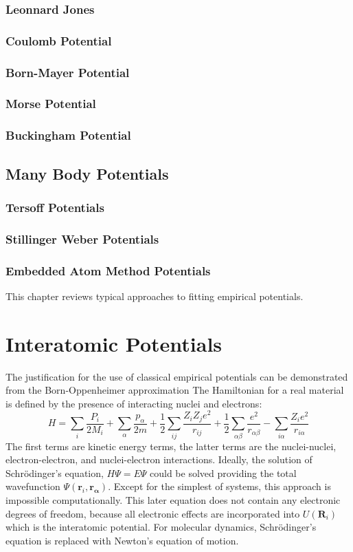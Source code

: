 \subsubsection{Leonnard Jones}
\subsubsection{Coulomb Potential}
\subsubsection{Born-Mayer Potential}
\subsubsection{Morse Potential}
\subsubsection{Buckingham Potential}
\subsection{Many Body Potentials}
\subsubsection{Tersoff Potentials}
\subsubsection{Stillinger Weber Potentials}
\subsubsection{Embedded Atom Method Potentials}
This chapter reviews typical approaches to fitting empirical potentials.
\section{Interatomic Potentials}
The justification for the use of classical empirical potentials can be demonstrated from the Born-Oppenheimer approximation\cite{born1927_bo}  The Hamiltonian for a real material is defined by the presence of interacting nuclei and electrons:
\begin{equation}
	H = \sum_i \frac{P_i}{2M_i}
	    + \sum_\alpha \frac{p_\alpha}{2m}
	    + \frac{1}{2} \sum_{ij} \frac{Z_i Z_j e^2}{r_{ij}}
	    + \frac{1}{2} \sum_{\alpha\beta} \frac{e^2}{r_{\alpha\beta}}
	    - \sum_{i\alpha} \frac{Z_i e^2}{r_{i\alpha}}
\end{equation}
The first terms are kinetic energy terms, the latter terms are the nuclei-nuclei, electron-electron, and nuclei-electron interactions.  Ideally, the solution of Schr\"{o}dinger's equation, $H\Psi=E\Psi$ could be solved providing the total wavefunction $\Psi(\bm{r}_i,\bm{r_\alpha})$.  Except for the simplest of systems, this approach is impossible computationally.
This later equation does not contain any electronic degrees of freedom, because all electronic effects are incorporated into $U(\bm{R}_i)$ which is the interatomic potential.  For molecular dynamics, Schr\"{o}dinger's equation is replaced with Newton's equation of motion.
